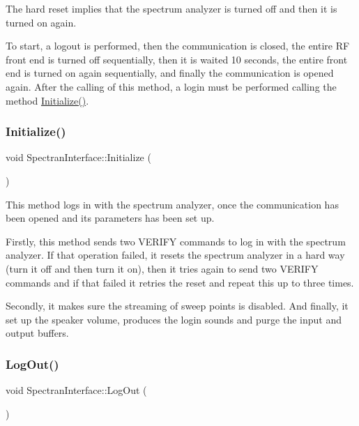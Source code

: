 The hard reset implies that the spectrum analyzer is turned off and then it is turned on again. 

To start, a logout is performed, then the communication is closed, the entire RF front end is turned off sequentially, then it is waited 10 seconds, the entire front end is turned on again sequentially, and finally the communication is opened again. After the calling of this method, a login must be performed calling the method \hyperlink{classSpectranInterface_a29d4a40c802f909b19014a5bfdac7db5}{Initialize()}. \mbox{\label{classSpectranInterface_a29d4a40c802f909b19014a5bfdac7db5}} 
\subsubsection{\texorpdfstring{Initialize()}{Initialize()}}
{\footnotesize\ttfamily void Spectran\+Interface\+::\+Initialize (\begin{DoxyParamCaption}{ }\end{DoxyParamCaption})}



This method logs in with the spectrum analyzer, once the communication has been opened and its parameters has been set up. 

Firstly, this method sends two V\+E\+R\+I\+FY commands to log in with the spectrum analyzer. If that operation failed, it resets the spectrum analyzer in a hard way (turn it off and then turn it on), then it tries again to send two V\+E\+R\+I\+FY commands and if that failed it retries the reset and repeat this up to three times.

Secondly, it makes sure the streaming of sweep points is disabled. And finally, it set up the speaker volume, produces the login sounds and purge the input and output buffers. \mbox{\label{classSpectranInterface_a8884f03d3075589a2850c83c9fd57e72}} 
\subsubsection{\texorpdfstring{Log\+Out()}{LogOut()}}
{\footnotesize\ttfamily void Spectran\+Interface\+::\+Log\+Out (\begin{DoxyParamCaption}{ }\end{DoxyParamCaption})}



